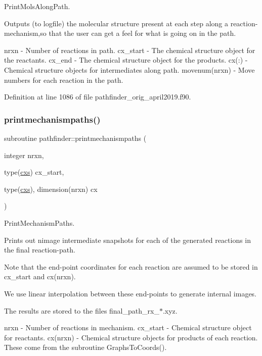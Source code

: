 Print\+Mols\+Along\+Path. 

Outputs (to logfile) the molecular structure present at each step along a reaction-\/mechanism,so that the user can get a feel for what is going on in the path.

nrxn -\/ Number of reactions in path. cx\+\_\+start -\/ The chemical structure object for the reactants. cx\+\_\+end -\/ The chemical structure object for the products. cx(\+:) -\/ Chemical structure objects for intermediates along path. movenum(nrxn) -\/ Move numbers for each reaction in the path. 

Definition at line 1086 of file pathfinder\+\_\+orig\+\_\+april2019.\+f90.

\mbox{\label{namespacepathfinder_a7afe472ec7144349a286bb38d261b0db}} 
\subsubsection{\texorpdfstring{printmechanismpaths()}{printmechanismpaths()}\hspace{0.1cm}{\footnotesize\ttfamily [2/3]}}
{\footnotesize\ttfamily subroutine pathfinder\+::printmechanismpaths (\begin{DoxyParamCaption}\item[{integer}]{nrxn,  }\item[{type(\mbox{\hyperlink{structchemstr_1_1cxs}{cxs}})}]{cx\+\_\+start,  }\item[{type(\mbox{\hyperlink{structchemstr_1_1cxs}{cxs}}), dimension(nrxn)}]{cx }\end{DoxyParamCaption})}



Print\+Mechanism\+Paths. 

Prints out nimage intermediate snapshots for each of the generated reactions in the final reaction-\/path.

Note that the end-\/point coordinates for each reaction are assumed to be stored in cx\+\_\+start and cx(nrxn).

We use linear interpolation between these end-\/points to generate internal images.

The results are stored to the files final\+\_\+path\+\_\+rx\+\_\+$\ast$.xyz.

nrxn -\/ Number of reactions in mechanism. cx\+\_\+start -\/ Chemical structure object for reactants. cx(nrxn) -\/ Chemical structure objects for products of each reaction. These come from the subroutine Graphs\+To\+Coords(). 

